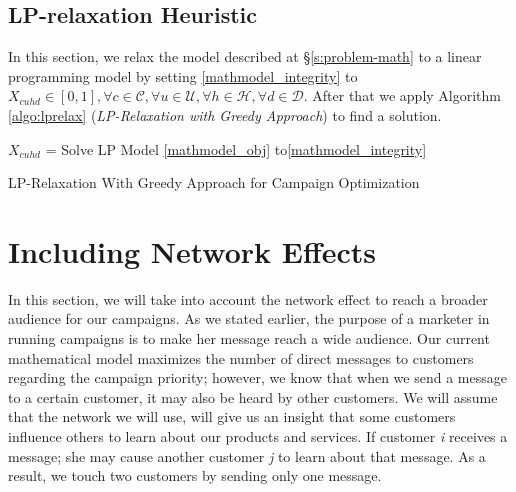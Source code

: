 \documentclass[11pt]{article}
\begin{document}
\subsection{LP-relaxation Heuristic} \label{s:lp_relaxation_heuristic}
In this section, we relax the model described at \S \ref{s:problem-math} to a linear programming model by setting \eqref{mathmodel_integrity} to $X_{{c}{u}{h}{d}} \in [0,1],\forall c \in \mathcal{C}, \forall u \in \mathcal{U}, \forall h \in \mathcal{H}, \forall d \in \mathcal{D}$. After that we apply Algorithm \ref{algo:lprelax} (\textit{LP-Relaxation with Greedy Approach}) to find a solution.\\
\begin{algorithm}[H]
\DontPrintSemicolon
{}

  \;
$X_{{c}{u}{h}{d}}$ = Solve LP Model \eqref{mathmodel_obj} to\eqref{mathmodel_integrity}

\;
\caption{LP-Relaxation With Greedy Approach for Campaign Optimization}
\label{algo:lprelax}
\end{algorithm}

\newpage
\section{Including Network Effects} \label{s:net-effect}
In this section, we will take into account the network effect to reach a broader audience for our campaigns. As we stated earlier, the purpose of a marketer in running campaigns is to make her message reach a wide audience. Our current mathematical model maximizes the number of direct messages to customers regarding the campaign priority; however, we know that when we send a message to a certain customer, it may also be heard by other customers. We will assume that the network we will use, will give us an insight that some customers influence others to learn about our products and services. If customer \textit{i} receives a message; she may cause another customer \textit{j} to learn about that message. As a result, we touch two customers by sending only one message.
\end{document}
